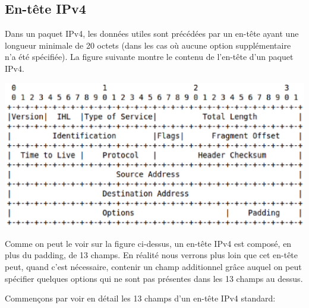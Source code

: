 
\subsection{En-tête IPv4}
Dans un paquet IPv4, les données utiles sont précédées par un en-tête ayant une longueur minimale de 20 octets 
(dans les cas où aucune option supplémentaire n'a été spécifiée).
La figure suivante montre le contenu de l'en-tête d'un paquet IPv4.


\includegraphics[width=15cm]{./pics/IPv4header.eps}


Comme on peut le voir sur la figure ci-dessus, un en-tête IPv4 est composé, en plus du padding, de
13 champs. En réalité nous verrons plus loin que cet en-tête
peut, quand c'est nécessaire, contenir un champ additionnel grâce auquel
on peut spécifier quelques options qui ne sont pas présentes dans les 13 champs
au dessus.


Commençons par voir en détail les 13 champs d'un en-tête IPv4 standard:

